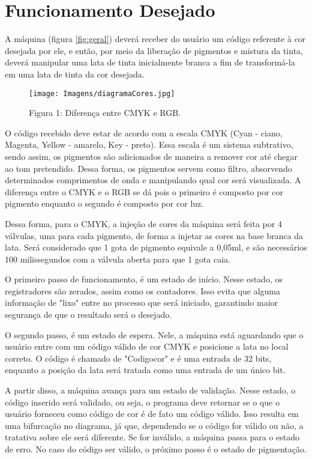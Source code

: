 \documentclass[12pt,a4paper,oneside]{abntex2}
\begin{document}
        \section{Funcionamento Desejado}
            A máquina (figura \ref{fig:geral}) deverá receber do usuário um código referente à cor desejada por ele, e então, por meio da liberação de pigmentos e mistura da tinta, deverá manipular uma lata de tinta inicialmente branca a fim de transformá-la em uma lata de tinta da cor desejada. \par
            \begin{figure}[h]
                \centering
                \texttt{[image: Imagens/diagramaCores.jpg]}
                \caption{Figura 1: Diferença entre CMYK e RGB.}
                \label{fig:cores}
            \end{figure}
            O código recebido deve estar de acordo com a escala CMYK (Cyan - ciano, Magenta, Yellow - amarelo, Key - preto). Essa escala é um sistema subtrativo, sendo assim, os pigmentos são adicionados de maneira a remover cor até chegar ao tom pretendido. Dessa forma, os pigmentos servem como filtro, absorvendo determinados comprimentos de onda e manipulando qual cor será visualizada. A diferença entre o CMYK e o RGB se dá pois o primeiro é composto por cor pigmento enquanto o segundo é composto por cor luz.\par
            Dessa forma, para o CMYK, a injeção de cores da máquina será feita por 4 válvulas, uma para cada pigmento, de forma a injetar as cores na base branca da lata. Será considerado que 1 gota de pigmento equivale a 0,05ml, e são necessários 100 milissegundos com a válvula aberta para que 1 gota caia.\par
            O primeiro passo de funcionamento, é um estado de início. Nesse estado, os registradores são zerados, assim como os contadores. Isso evita que alguma informação de "lixo" entre no processo que será iniciado, garantindo maior segurança de que o resultado será o desejado.\par
            O segundo passo, é um estado de espera. Nele, a máquina está aguardando que o usuário entre com um código válido de cor CMYK e posicione a lata no local correto. O código é chamado de "Codigo\textunderscore cor" e é uma entrada de 32 bits, enquanto a posição da lata será tratada como uma entrada de um único bit.\par
            A partir disso, a máquina avança para um estado de validação. Nesse estado, o código inserido será validado, ou seja, o programa deve retornar se o que o usuário forneceu como código de cor é de fato um código válido. Isso resulta em uma bifurcação no diagrama, já que, dependendo se o código for válido ou não, a tratativa sobre ele será diferente. Se for inválido, a máquina passa para o estado de erro. No caso do código ser válido, o próximo passo é o estado de pigmentação.\par
\end{document}
